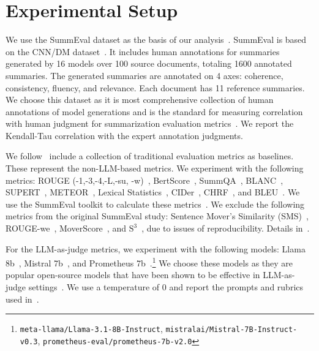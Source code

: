 
\section{Experimental Setup}\label{sec:6-chapter-experimental-setup}

We use the SummEval dataset as the basis of our analysis~\cite{fabbri2021summeval}. SummEval is based on the CNN/DM dataset~\cite{Hermann2015TeachingMT,Nallapati2016AbstractiveTS}. It includes human annotations for summaries generated by 16 models over 100 source documents, totaling 1600 annotated summaries. The generated summaries are annotated on 4 axes: coherence, consistency, fluency, and relevance.  Each document has 11 reference summaries. We choose this dataset as it is most comprehensive collection of human annotations of model generations and is the standard for measuring correlation with human judgment for summarization evaluation metrics~\cite{fabbri2021summeval,liu2023geval}. We report the Kendall-Tau correlation with the expert annotation judgments.

We follow~\textcite{fabbri2021summeval} include a collection of traditional evaluation metrics as baselines. These represent the non-LLM-based metrics. We experiment with the following metrics: ROUGE (-1,-3,-4,-L,-su, -w)~\cite{lin2004rouge},  BertScore~\cite{zhang2020bertscore},  SummQA~\cite{scialom2019summa}, BLANC~\cite{vasilyev2020blanc}, SUPERT~\cite{gao2020supert}, METEOR~\cite{banerjee2005meteor}, Lexical Statistics~\cite{fabbri2021summeval}, CIDer~\cite{vedantam2015cider}, CHRF~\cite{popovic-2015-chrf}, and BLEU~\cite{papineni2002bleu}. We use the SummEval toolkit to calculate these metrics~\cite{fabbri2021summeval}.  We exclude the following metrics from the original SummEval study: Sentence Mover's Similarity (SMS)~\cite{clark-etal-2019-sentence}, ROUGE-we~\cite{ng-abrecht-2015-better}, MoverScore~\cite{zhao2019moverscore}, and $\mathrm{S}^3$~\cite{peyrard-eckle-kohler-2017-principled}, due to issues of reproducibility. Details in~.

For the LLM-as-judge metrics, we experiment with the following models: Llama 8b~\cite{grattafiori2024llama3}, Mistral 7b~\cite{jiang2023mistral7b}, and Prometheus 7b~\cite{kim2023prometheus}.\footnote{\texttt{meta-llama/Llama-3.1-8B-Instruct}, \texttt{mistralai/Mistral-7B-Instruct-v0.3}, \texttt{prometheus-eval/prometheus-7b-v2.0}} We choose these models as they are popular open-source models that have been shown to be effective in LLM-as-judge settings~\cite{zheng2023judging,kim2023prometheus}. We use a temperature of $0$ and report the prompts and rubrics used in~. 



